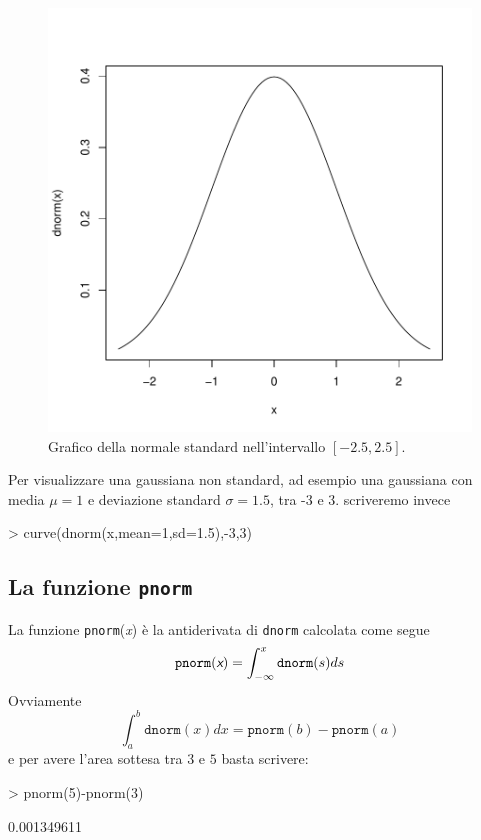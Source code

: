 \documentclass[onecolumn,12pt]{book}
\newcommand{\varia}[1]{\textsl{\textsf{#1}}}
\begin{document}
\begin{figure}[htbp]
\begin{center}
\includegraphics{RbookParte2-067}
\caption{ Grafico della normale standard nell'intervallo $[-2.5,2.5]$. }
\label{fig:normalesta}
\end{center}
\end{figure}
Per  visualizzare una gaussiana non standard, ad esempio una gaussiana con media $\mu=1$ e  deviazione standard $\sigma=1.5$, tra -3 e 3. scriveremo invece
\begin{Schunk}
\begin{Sinput}
> curve(dnorm(x,mean=1,sd=1.5),-3,3)
\end{Sinput}
\end{Schunk}
\subsection{La funzione \texttt{pnorm}}
La funzione \texttt{pnorm}(\varia{x})   \`e la antiderivata di \texttt{dnorm} calcolata come segue
\begin{equation*}\texttt{pnorm}(\varia{x}) =\int_{-\infty}^x  \texttt{dnorm}(s)ds
\end{equation*}
Ovviamente
$$\int_a^b \texttt{dnorm}(x)dx=\texttt{pnorm}(b)-\texttt{pnorm}(a)$$
e per avere l'area sottesa tra $3$ e $5$  basta scrivere:
\begin{Schunk}
\begin{Sinput}
> pnorm(5)-pnorm(3)
\end{Sinput}
\begin{Soutput}
[1] 0.001349611
\end{Soutput}
\end{Schunk}
\end{document}
